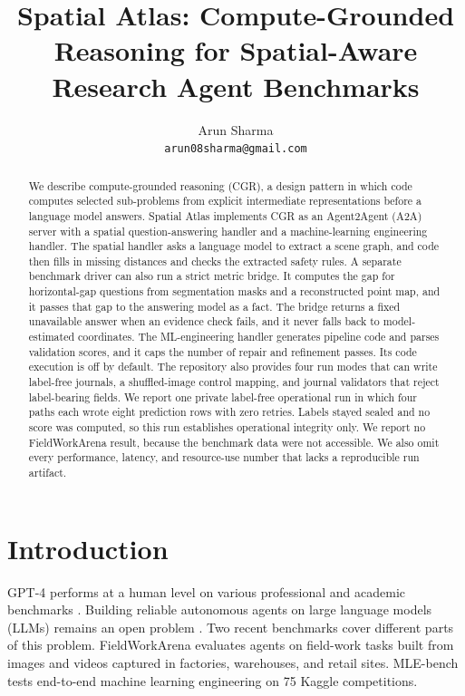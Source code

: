 \documentclass{article}
\title{Spatial Atlas: Compute-Grounded Reasoning for Spatial-Aware Research Agent Benchmarks}
\author{Arun Sharma\\\texttt{arun08sharma@gmail.com}}
\begin{document}
\maketitle

\begin{abstract}
We describe compute-grounded reasoning (CGR), a design pattern in which code computes selected sub-problems from explicit intermediate representations before a language model answers. Spatial Atlas implements CGR as an Agent2Agent (A2A) server with a spatial question-answering handler and a machine-learning engineering handler. The spatial handler asks a language model to extract a scene graph, and code then fills in missing distances and checks the extracted safety rules. A separate benchmark driver can also run a strict metric bridge. It computes the gap for horizontal-gap questions from segmentation masks and a reconstructed point map, and it passes that gap to the answering model as a fact. The bridge returns a fixed unavailable answer when an evidence check fails, and it never falls back to model-estimated coordinates. The ML-engineering handler generates pipeline code and parses validation scores, and it caps the number of repair and refinement passes. Its code execution is off by default. The repository also provides four run modes that can write label-free journals, a shuffled-image control mapping, and journal validators that reject label-bearing fields. We report one private label-free operational run in which four paths each wrote eight prediction rows with zero retries. Labels stayed sealed and no score was computed, so this run establishes operational integrity only. We report no FieldWorkArena result, because the benchmark data were not accessible. We also omit every performance, latency, and resource-use number that lacks a reproducible run artifact.
\end{abstract}

\section{Introduction}
\label{sec:intro}

GPT-4 performs at a human level on various professional and academic benchmarks \citep{openai2023gpt4}. Building reliable autonomous agents on large language models (LLMs) remains an open problem \citep{wang2024survey}. Two recent benchmarks cover different parts of this problem. FieldWorkArena \citep{fieldworkarena2025} evaluates agents on field-work tasks built from images and videos captured in factories, warehouses, and retail sites. MLE-bench \citep{chan2024mlebench} tests end-to-end machine learning engineering on 75 Kaggle competitions.
\end{document}
